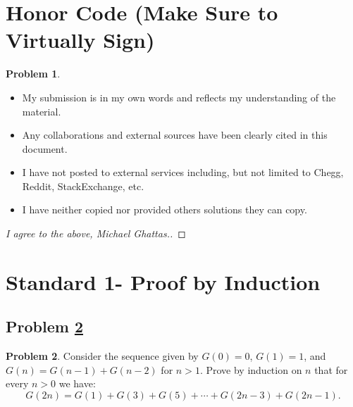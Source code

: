 \documentclass[11pt]{article}
\theoremstyle{definition}
\theoremstyle{definition}
\newtheorem{required}{Problem}
\theoremstyle{definition}
\begin{document}
\section{Honor Code (Make Sure to Virtually Sign)} \label{HonorCode}

\begin{required}
\begin{itemize}
\item My submission is in my own words and reflects my understanding of the material.
\item Any collaborations and external sources have been clearly cited in this document.
\item I have not posted to external services including, but not limited to Chegg, Reddit, StackExchange, etc.
\item I have neither copied nor provided others solutions they can copy.
\end{itemize}

\end{required}

\begin{proof}[I agree to the above, Michael Ghattas.]
\end{proof}


\newpage
\section{Standard 1- Proof by Induction}

\subsection{Problem \ref{Induction1}}
\begin{required} \label{Induction1}
Consider the sequence given by $G(0) = 0$, $G(1) = 1$, and $G(n) = G(n-1) + G(n-2)$ for $n > 1$. Prove by induction on $n$ that for every $n > 0$ we have:
\[
G(2n) = G(1) + G(3) + G(5) + \cdots + G(2n-3) + G(2n-1).
\]
\end{required}


\end{document}
